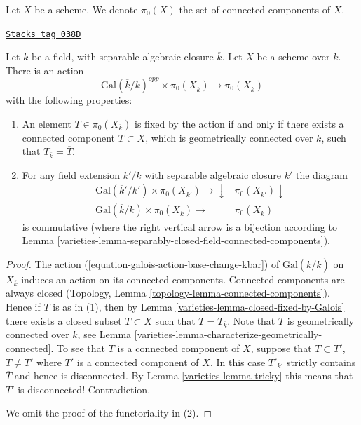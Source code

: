 Let $X$ be a scheme. We denote $\pi_0(X)$ the set of connected
components of $X$.

\begin{lemma}
\label{varieties-lemma-galois-action-connected-components}
\href{https://stacks.math.columbia.edu/tag/038D}{\texttt{Stacks tag 038D}}

Let $k$ be a field, with separable algebraic closure $\overline{k}$.
Let $X$ be a scheme over $k$.
There is an action
$$
\text{Gal}(\overline{k}/k)^{opp} \times \pi_0(X_{\overline{k}})
\longrightarrow
\pi_0(X_{\overline{k}})
$$
with the following properties:
\begin{enumerate}
\item An element $\overline{T} \in \pi_0(X_{\overline{k}})$
is fixed by the action if and only if there exists a connected component
$T \subset X$, which is geometrically connected over $k$,
such that $T_{\overline{k}} = \overline{T}$.
\item For any field extension $k'/k$ with separable
algebraic closure $\overline{k}'$ the diagram
$$
\begin{array}{cc}\text{Gal}(\overline{k}'/k') \times \pi_0(X_{\overline{k}'})
\longrightarrow\downarrow & \pi_0(X_{\overline{k}'}) \downarrow \\ \text{Gal}(\overline{k}/k) \times \pi_0(X_{\overline{k}})
\longrightarrow & \pi_0(X_{\overline{k}})\end{array}
$$
is commutative (where the right vertical arrow is a bijection
according to Lemma \ref{varieties-lemma-separably-closed-field-connected-components}).
\end{enumerate}
\end{lemma}

\begin{proof}

The action (\ref{equation-galois-action-base-change-kbar})
of $\text{Gal}(\overline{k}/k)$ on $X_{\overline{k}}$
induces an action on its connected components.
Connected components are always closed
(Topology, Lemma \ref{topology-lemma-connected-components}).
Hence if $\overline{T}$ is as in (1), then by
Lemma \ref{varieties-lemma-closed-fixed-by-Galois} there exists a closed
subset $T \subset X$ such that $\overline{T} = T_{\overline{k}}$.
Note that $T$ is geometrically connected over $k$, see
Lemma \ref{varieties-lemma-characterize-geometrically-connected}.
To see that $T$ is a connected component of $X$, suppose that
$T \subset T'$, $T \not = T'$ where $T'$ is a connected component of $X$.
In this case $T'_{k'}$ strictly contains $\overline{T}$ and hence is
disconnected. By Lemma \ref{varieties-lemma-tricky} this means that $T'$ is
disconnected! Contradiction.

\medskip\noindent
We omit the proof of the functoriality in (2).
\end{proof}

